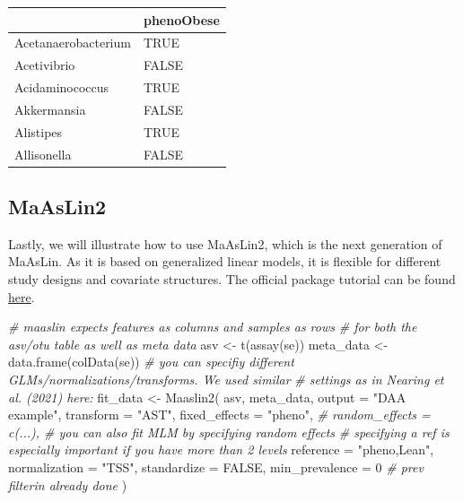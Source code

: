 \documentclass[
]{book}
\newenvironment{Shaded}{\begin{snugshade}}{\end{snugshade}}
\newcommand{\AttributeTok}[1]{\textcolor[rgb]{0.77,0.63,0.00}{#1}}
\newcommand{\CommentTok}[1]{\textcolor[rgb]{0.56,0.35,0.01}{\textit{#1}}}
\newcommand{\ConstantTok}[1]{\textcolor[rgb]{0.00,0.00,0.00}{#1}}
\newcommand{\DecValTok}[1]{\textcolor[rgb]{0.00,0.00,0.81}{#1}}
\newcommand{\FunctionTok}[1]{\textcolor[rgb]{0.00,0.00,0.00}{#1}}
\newcommand{\NormalTok}[1]{#1}
\newcommand{\OtherTok}[1]{\textcolor[rgb]{0.56,0.35,0.01}{#1}}
\newcommand{\StringTok}[1]{\textcolor[rgb]{0.31,0.60,0.02}{#1}}
\begin{document}
\begin{tabular}{l|l}
\hline
  & phenoObese\\
\hline
Acetanaerobacterium & TRUE\\
\hline
Acetivibrio & FALSE\\
\hline
Acidaminococcus & TRUE\\
\hline
Akkermansia & FALSE\\
\hline
Alistipes & TRUE\\
\hline
Allisonella & FALSE\\
\hline
\end{tabular}

\hypertarget{maaslin2}{%
\subsection{MaAsLin2}\label{maaslin2}}

Lastly, we will illustrate how to use MaAsLin2, which is the next generation of
MaAsLin. As it is based on generalized linear models, it is flexible for different study designs and covariate
structures. The official package tutorial can be found \href{https://github.com/biobakery/biobakery/wiki/maaslin2}{here}.

\begin{Shaded}
\begin{Highlighting}[]
\CommentTok{\# maaslin expects features as columns and samples as rows }
\CommentTok{\# for both the asv/otu table as well as meta data }
\NormalTok{asv }\OtherTok{\textless{}{-}} \FunctionTok{t}\NormalTok{(}\FunctionTok{assay}\NormalTok{(se))}
\NormalTok{meta\_data }\OtherTok{\textless{}{-}} \FunctionTok{data.frame}\NormalTok{(}\FunctionTok{colData}\NormalTok{(se))}
\CommentTok{\# you can specifiy different GLMs/normalizations/transforms. We used similar}
\CommentTok{\# settings as in Nearing et al. (2021) here:}
\NormalTok{fit\_data }\OtherTok{\textless{}{-}} \FunctionTok{Maaslin2}\NormalTok{(}
\NormalTok{  asv,}
\NormalTok{  meta\_data,}
  \AttributeTok{output =} \StringTok{"DAA example"}\NormalTok{,}
  \AttributeTok{transform =} \StringTok{"AST"}\NormalTok{,}
  \AttributeTok{fixed\_effects =} \StringTok{"pheno"}\NormalTok{,}
  \CommentTok{\# random\_effects = c(...), \# you can also fit MLM by specifying random effects}
  \CommentTok{\# specifying a ref is especially important if you have more than 2 levels}
  \AttributeTok{reference =} \StringTok{"pheno,Lean"}\NormalTok{,  }
  \AttributeTok{normalization =} \StringTok{"TSS"}\NormalTok{,}
  \AttributeTok{standardize =} \ConstantTok{FALSE}\NormalTok{,}
  \AttributeTok{min\_prevalence =} \DecValTok{0} \CommentTok{\# prev filterin already done}
\NormalTok{)}
\end{Highlighting}
\end{Shaded}
\end{document}
